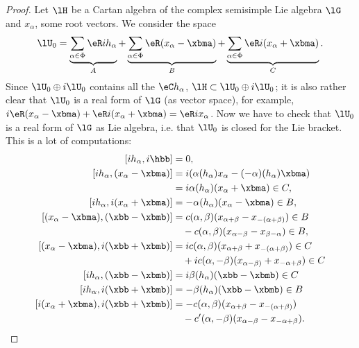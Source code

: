 \begin{proof}
Let $\lH$ be a Cartan algebra of the complex semisimple Lie algebra $\lG$ and $ x_{\alpha}$, some root vectors. We consider the space
\begin{equation}
 \lU_0=\underbrace{\sum_{\alpha\in\Phi}\eR ih_{\alpha}}_A+\underbrace{\sum_{\alpha\in\Phi}\eR( x_{\alpha}-\xbma)}_B+\underbrace{\sum_{\alpha\in\Phi}\eR i( x_{\alpha}+\xbma)}_C.
\end{equation}
Since $\lU_0\oplus i\lU_0$ contains all the $\eC h_{\alpha}$, $\lH\subset\lU_0\oplus i\lU_0$; it is also rather clear that $\lU_0$ is a real form of $\lG$ (as vector space), for example, $i\eR( x_{\alpha}-\xbma)+\eR i( x_{\alpha}+\xbma)=\eR i x_{\alpha}$. Now we have to check that $\lU_0$ is a real form of $\lG$ as Lie algebra, i.e. that $\lU_0$ is closed for the Lie bracket. This is a lot of computations:
\[
\begin{split}
[i h_{\alpha},i\hbb]               &=0,\\
[i h_{\alpha},( x_{\alpha}-\xbma)]        &=i(\alpha( h_{\alpha}) x_{\alpha}-(-\alpha)( h_{\alpha})\xbma)\\
                            &=i\alpha( h_{\alpha})( x_{\alpha}+\xbma)\in C,\\
[i h_{\alpha},i( x_{\alpha}+\xbma)]       &=-\alpha( h_{\alpha})( x_{\alpha}-\xbma)\in B,\\
[( x_{\alpha}-\xbma),(\xbb-\xbmb)] &=c(\alpha,\beta)( x_{\alpha+\beta}-x_{-(\alpha+\beta)} )\in B\\
                            &\quad -c(\alpha,\beta)(x_{\alpha-\beta}-x_{\beta-\alpha})\in B,\\
[( x_{\alpha}-\xbma),i(\xbb+\xbmb)]&=ic(\alpha,\beta)(x_{\alpha+\beta}+x_{-(\alpha+\beta)})\in C\\
                            &\quad +ic(\alpha,-\beta)(x_{\alpha-\beta)}+x_{-\alpha+\beta})\in C\\
[i h_{\alpha},(\xbb-\xbmb)]     &=i\beta( h_{\alpha})(\xbb-\xbmb)\in C\\
[i h_{\alpha},i(\xbb+\xbmb)]       &=-\beta( h_{\alpha})(\xbb-\xbmb)\in B\\
[i( x_{\alpha}+\xbma),i(\xbb+\xbmb)]&=-c(\alpha,\beta)(x_{\alpha+\beta}-x_{-(\alpha+\beta)})\\
                             &\quad -c'(\alpha,-\beta)(x_{\alpha-\beta}-x_{-\alpha+\beta}).
\end{split}
\]


\end{proof}
